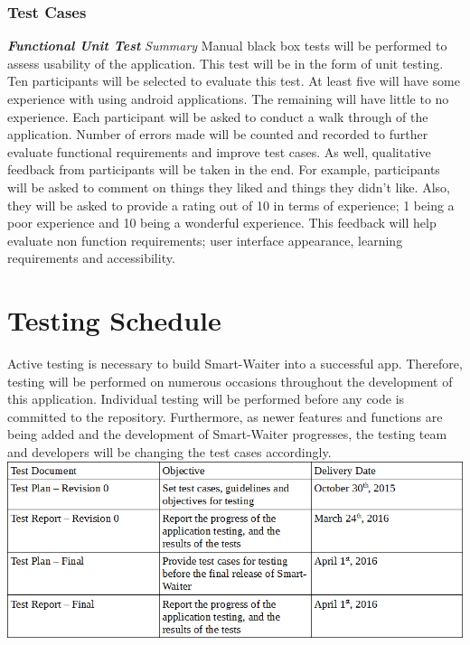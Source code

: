 \documentclass[12pt]{article}
\begin{document}
\subsubsection{Test Cases}
\textbf{\textit{Functional Unit Test}}\newline
\newline
\textit{Summary}\newline
Manual black box tests will be performed to assess usability of the application. This test will be in the form of unit testing. Ten participants will be selected to evaluate this test. At least five will have some experience with using android applications. The remaining will have little to no experience. Each participant will be asked to conduct a walk through of the application. Number of errors made will be counted and recorded to further evaluate functional requirements and improve test cases. As well, qualitative feedback from participants will be taken in the end. For example, participants will be asked to comment on things they liked and things they didn't like. Also, they will be asked to provide a rating out of 10 in terms of experience; 1 being a poor experience and 10 being a wonderful experience. This feedback will help evaluate non function requirements; user interface appearance, learning requirements and accessibility. 
\newline

\section{Testing Schedule}
Active testing is necessary to build Smart-Waiter into a successful app. Therefore, testing will be performed on numerous occasions throughout the development of this application. Individual testing will be performed before any code is committed to the repository. Furthermore, as newer features and functions are being added and the development of Smart-Waiter progresses, the testing team and developers will be changing the test cases accordingly. 
\newline
\newline
\includegraphics[width=\textwidth,height=\textheight,keepaspectratio]{TestingSchedule.png}
\end{document}
